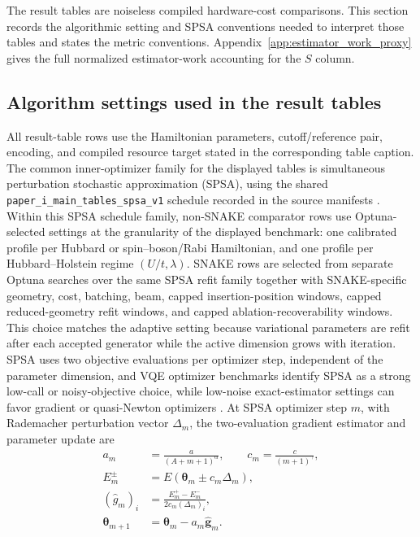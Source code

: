 \documentclass[
  reprint,
  amsmath,
  amssymb,
  aps,
  pra,
  nofootinbib,
  superscriptaddress,
  floatfix
]{revtex4-2}
\begin{document}
The result tables are noiseless compiled hardware-cost comparisons. This section
records the algorithmic setting and SPSA conventions needed to interpret those tables and
states the metric conventions. Appendix~\ref{app:estimator_work_proxy} gives the
full normalized estimator-work accounting for the \(S\) column.

\subsection{Algorithm settings used in the result tables}

All result-table rows use the Hamiltonian parameters, cutoff/reference pair,
encoding, and compiled resource target stated in the corresponding table
caption. The common inner-optimizer family for the displayed tables is simultaneous
perturbation stochastic approximation (SPSA), using the shared
\texttt{paper\_i\_main\_tables\_spsa\_v1} schedule recorded in the source
manifests \cite{Spall1992SPSA,Kandala2017}. Within this SPSA schedule family,
non-SNAKE comparator rows use Optuna-selected settings at the granularity of the
displayed benchmark: one calibrated profile per Hubbard or spin--boson/Rabi
Hamiltonian, and one profile per Hubbard--Holstein regime \((U/t,\lambda)\).
SNAKE rows are selected from separate Optuna searches over the same SPSA refit
family together with SNAKE-specific geometry, cost, batching, beam,
capped insertion-position windows, capped reduced-geometry refit windows, and
capped ablation-recoverability windows. This choice matches the adaptive
setting because variational parameters are refit after each accepted generator
while the active dimension grows with iteration. SPSA uses two objective
evaluations per optimizer step, independent of the parameter dimension, and VQE
optimizer benchmarks identify SPSA as a strong low-call or noisy-objective
choice, while low-noise exact-estimator settings can favor gradient or
quasi-Newton optimizers
\cite{BonetMonroig2023Optimizer,Singh2023Optimizers,Jones2025FermiHubbardOptimizers}.
At SPSA optimizer step \(m\), with
Rademacher perturbation vector \(\Delta_m\), the two-evaluation gradient
estimator and parameter update are
\begin{align}
a_m&=\frac{a}{(A+m+1)^\alpha},\qquad
c_m=\frac{c}{(m+1)^\gamma}, \nonumber\\
E_m^\pm&=E(\boldsymbol{\theta}_m\pm c_m\Delta_m), \nonumber\\
(\widehat g_m)_i&=\frac{E_m^+-E_m^-}{2c_m(\Delta_m)_i}, \nonumber\\
\boldsymbol{\theta}_{m+1}&=\boldsymbol{\theta}_m-a_m\widehat{\mathbf g}_m .
\label{eq:spsa_inner_optimizer}
\end{align}
\end{document}
